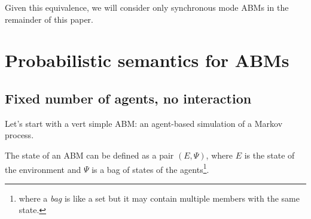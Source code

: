 \documentclass[letterpaper,twocolumn,10pt]{article}
\begin{document}
Given this equivalence, we will consider only synchronous mode ABMs in the remainder of this paper.

\section{Probabilistic semantics for ABMs}

\subsection{Fixed number of agents, no interaction}

Let's start with a vert simple ABM: an agent-based simulation of a Markov process.  

The state of an ABM can be defined as a pair $(E ,\Psi)$, where $E$ is the state of the environment and $\Psi$ is a bag of states of the agents\footnote{where a \textit{bag} is like a set but it may contain multiple members with the same state.}.




\end{document}
